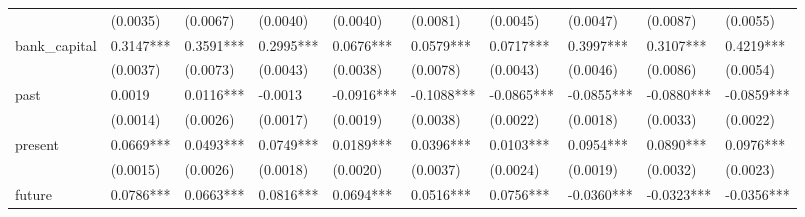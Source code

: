 \begin{table}
\begin{center}
\begin{tabular}{llllllllll}
                         & (0.0035)               & (0.0067)                & (0.0040)                 & (0.0040)                    & (0.0081)                     & (0.0045)                      & (0.0047)                   & (0.0087)                    & (0.0055)                      \\
bank\_capital            & 0.3147***              & 0.3591***               & 0.2995***                & 0.0676***                   & 0.0579***                    & 0.0717***                     & 0.3997***                  & 0.3107***                   & 0.4219***                     \\
                         & (0.0037)               & (0.0073)                & (0.0043)                 & (0.0038)                    & (0.0078)                     & (0.0043)                      & (0.0046)                   & (0.0086)                    & (0.0054)                      \\
past                     & 0.0019                 & 0.0116***               & -0.0013                  & -0.0916***                  & -0.1088***                   & -0.0865***                    & -0.0855***                 & -0.0880***                  & -0.0859***                    \\
                         & (0.0014)               & (0.0026)                & (0.0017)                 & (0.0019)                    & (0.0038)                     & (0.0022)                      & (0.0018)                   & (0.0033)                    & (0.0022)                      \\
present                  & 0.0669***              & 0.0493***               & 0.0749***                & 0.0189***                   & 0.0396***                    & 0.0103***                     & 0.0954***                  & 0.0890***                   & 0.0976***                     \\
                         & (0.0015)               & (0.0026)                & (0.0018)                 & (0.0020)                    & (0.0037)                     & (0.0024)                      & (0.0019)                   & (0.0032)                    & (0.0023)                      \\
future                   & 0.0786***              & 0.0663***               & 0.0816***                & 0.0694***                   & 0.0516***                    & 0.0756***                     & -0.0360***                 & -0.0323***                  & -0.0356***                    \\

\end{tabular}
\end{center}
\end{table}

